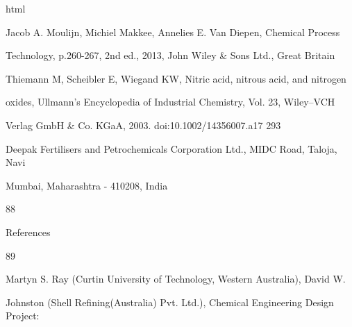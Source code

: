 \documentclass[a4paper,portrait,12pt]{article}
\begin{document}
\begin{flushleft}
html
\end{flushleft}


\begin{flushleft}
[5] Jacob A. Moulijn, Michiel Makkee, Annelies E. Van Diepen, Chemical Process
\end{flushleft}


\begin{flushleft}
Technology, p.260-267, 2nd ed., 2013, John Wiley \& Sons Ltd., Great Britain
\end{flushleft}


\begin{flushleft}
[6] Thiemann M, Scheibler E, Wiegand KW, Nitric acid, nitrous acid, and nitrogen
\end{flushleft}


\begin{flushleft}
oxides, Ullmann's Encyclopedia of Industrial Chemistry, Vol. 23, Wiley--VCH
\end{flushleft}


\begin{flushleft}
Verlag GmbH \& Co. KGaA, 2003. doi:10.1002/14356007.a17 293
\end{flushleft}


\begin{flushleft}
[7] Deepak Fertilisers and Petrochemicals Corporation Ltd., MIDC Road, Taloja, Navi
\end{flushleft}


\begin{flushleft}
Mumbai, Maharashtra - 410208, India
\end{flushleft}


88





\begin{flushleft}
\newpage
References
\end{flushleft}





89





\begin{flushleft}
[8] Martyn S. Ray (Curtin University of Technology, Western Australia), David W.
\end{flushleft}


\begin{flushleft}
Johnston (Shell Refining(Australia) Pvt. Ltd.), Chemical Engineering Design Project:
\end{flushleft}
\end{document}
